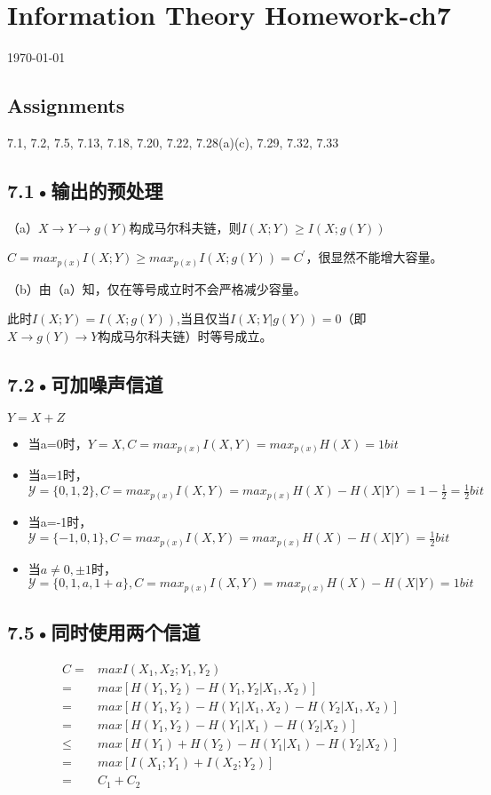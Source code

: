 \documentclass[UTF8]{ctexart}
\begin{document}
\section*{Information Theory Homework-ch7}
\begin{center}
\today
\end{center}
\subsection*{Assignments}


7.1, 7.2, 7.5, 7.13, 7.18, 7.20, 7.22, 7.28(a)(c), 7.29, 7.32, 7.33 


\subsection*{7.1•输出的预处理}
（a）$X\rightarrow Y\rightarrow g(Y) $构成马尔科夫链，则$I(X;Y)\geqslant I(X;g(Y))$

$C=max_{p(x)}I(X;Y)\geqslant max_{p(x)}I(X;g(Y))=C^\prime$，很显然不能增大容量。

（b）由（a）知，仅在等号成立时不会严格减少容量。

此时$I(X;Y)= I(X;g(Y))$,当且仅当$I(X;Y|g(Y))=0$（即$X\rightarrow g(Y)\rightarrow Y$构成马尔科夫链）时等号成立。


\subsection*{7.2•可加噪声信道}
$Y = X + Z$

\begin{itemize}
    \item 当a=0时，$Y=X, C=max_{p(x)}I(X,Y)=max_{p(x)}H(X)=1 bit$
    \item 当a=1时，$\mathcal{Y} =\{0,1,2\}, C=max_{p(x)}I(X,Y)=max_{p(x)}H(X)-H(X|Y)=1-\frac{1}{2}=\frac{1}{2} bit$
    \item 当a=-1时，$\mathcal{Y} =\{-1,0,1\}, C=max_{p(x)}I(X,Y)=max_{p(x)}H(X)-H(X|Y)=\frac{1}{2} bit$
    \item 当$a\neq 0,\pm 1$时，$\mathcal{Y} =\{0,1,a,1+a\}, C=max_{p(x)}I(X,Y)=max_{p(x)}H(X)-H(X|Y)=1 bit$
\end{itemize}
\subsection*{7.5•同时使用两个信道}
\begin{equation*}
    \begin{split}
        C=&maxI(X_1,X_2;Y_1,Y_2)\\
        =&max[H(Y_1,Y_2)-H(Y_1,Y_2|X_1,X_2)]\\
        =&max[H(Y_1,Y_2)-H(Y_1|X_1,X_2)-H(Y_2|X_1,X_2)]\\
        =&max[H(Y_1,Y_2)-H(Y_1|X_1)-H(Y_2|X_2)]\\
        \leqslant & max[H(Y_1)+H(Y_2)-H(Y_1|X_1)-H(Y_2|X_2)]\\
        =& max[I(X_1;Y_1)+I(X_2;Y_2)]\\
        =& C_1+C_2
    \end{split}
\end{equation*}
\end{document}
